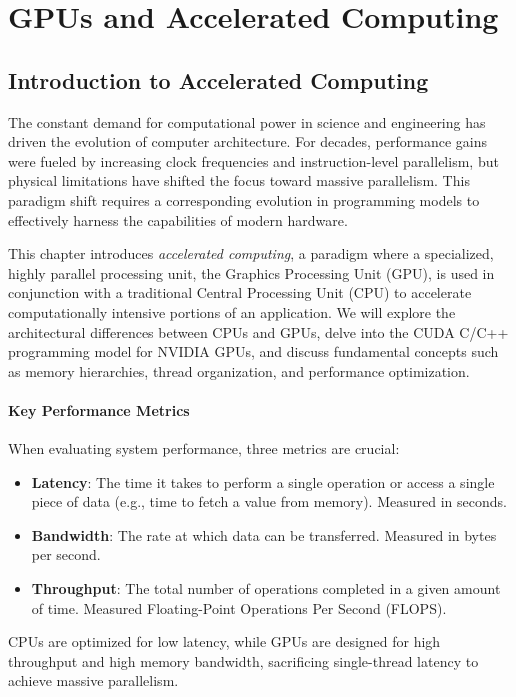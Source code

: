 \chapter{GPUs and Accelerated Computing}

\section{Introduction to Accelerated Computing}

The constant demand for computational power in science and engineering has driven the evolution of computer architecture. For decades, performance gains were fueled by increasing clock frequencies and instruction-level parallelism, but physical limitations have shifted the focus toward massive parallelism. This paradigm shift requires a corresponding evolution in programming models to effectively harness the capabilities of modern hardware.

This chapter introduces \textit{accelerated computing}, a paradigm where a specialized, highly parallel processing unit, the Graphics Processing Unit (GPU), is used in conjunction with a traditional Central Processing Unit (CPU) to accelerate computationally intensive portions of an application. We will explore the architectural differences between CPUs and GPUs, delve into the CUDA C/C++ programming model for NVIDIA GPUs, and discuss fundamental concepts such as memory hierarchies, thread organization, and performance optimization.

\subsubsection{Key Performance Metrics}

When evaluating system performance, three metrics are crucial:
\begin{itemize}
    \item \textbf{Latency}: The time it takes to perform a single operation or access a single piece of data (e.g., time to fetch a value from memory). Measured in seconds.
    \item \textbf{Bandwidth}: The rate at which data can be transferred. Measured in bytes per second.
    \item \textbf{Throughput}: The total number of operations completed in a given amount of time. Measured Floating-Point Operations Per Second (FLOPS).
\end{itemize}

CPUs are optimized for low latency, while GPUs are designed for high throughput and high memory bandwidth, sacrificing single-thread latency to achieve massive parallelism.


